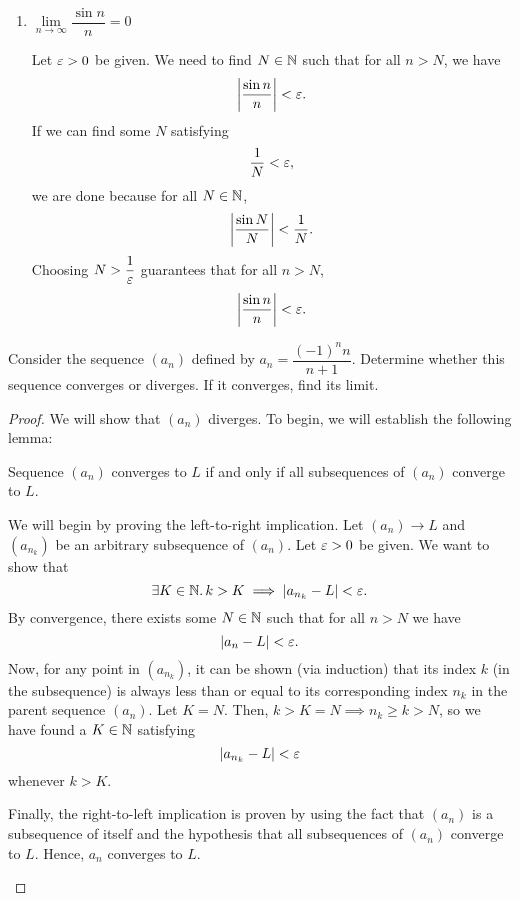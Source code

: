 \begin{problem}
\begin{enumerate}[label=(\alph*)]
    \item $\lim\limits_{n \to \infty} \dfrac{\sin n}{n} = 0$

      Let $\varepsilon > 0$ be given. We need to find $N \in \mathbb{N}$ such that for all $n > N$, we have 
      \[
        \left\lvert \frac{\sin n}{n} \right\rvert < \varepsilon.
      \]
      If we can find some $N$ satisfying
      \[
        \frac{1}{N} < \varepsilon,
      \]
      we are done because for all $N \in \mathbb{N}$,
      \[
        \left\lvert \frac{\sin N}{N} \right\rvert < \dfrac{1}{N}.
      \]
      Choosing $N > \dfrac{1}{\varepsilon}$ guarantees that for all $n > N$,
      \[
        \left\lvert \frac{\sin n}{n} \right\rvert < \varepsilon.
      \]

  \end{enumerate}

\end{problem}

\begin{problem}
  Consider the sequence $(a_{n})$ defined by $a_{n} = \dfrac{(-1)^{n} n}{n + 1}$.
  Determine whether this sequence converges or diverges. If it converges, find
  its limit.

  \begin{proof}
    We will show that $(a_{n})$ diverges. To begin, we will establish the following lemma:
    
    \begin{lemma} \label{lem:convergence-of-subsequences-iff-convergence-of-sequence}
      Sequence $(a_{n})$ converges to $L$ if and only if all subsequences of $(a_{n})$ converge to $L$.
    \end{lemma}

    \begin{subproof}
      We will begin by proving the left-to-right implication. Let $(a_{n}) \to L$ 
      and $(a_{n_{k}})$ be an arbitrary subsequence of $(a_{n})$.
      Let $\varepsilon > 0$ be given. We want to show that 
      \[
        \exists K \in \mathbb{N}.\,  k > K \implies \left\lvert a_{n_{k}} - L \right\rvert < \varepsilon.
      \]
      By convergence, there exists some $N \in \mathbb{N}$ such that for all $n > N$ we have
      \[
        \left\lvert a_{n} - L \right\rvert < \varepsilon.
      \]
      Now, for any point in $(a_{n_{k}})$, it can be shown (via induction) that 
      its index $k$ (in the subsequence) is always less than or equal to its
      corresponding index $n_{k}$ in the parent sequence $(a_{n})$. Let $K = N$. Then, 
      $k > K = N \implies n_{k} \geq k > N$, so we have found a $K \in \mathbb{N}$ satisfying 
      \[
        \left\lvert a_{n_{k}} - L \right\rvert < \varepsilon
      \]
      whenever $k > K$.

      Finally, the right-to-left implication is proven by using the fact that
      $(a_{n})$ is a subsequence of itself and the hypothesis that all
      subsequences of $(a_{n})$ converge to $L$. Hence, $a_{n}$ converges to $L$.
    \end{subproof}


\end{proof}
\end{problem}
